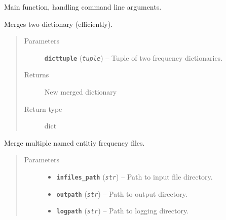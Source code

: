 \documentclass[letterpaper,10pt,english]{sphinxmanual}
\begin{document}

\begin{fulllineitems}
\label{src.prep.nes:src.prep.nes.merge.main}
Main function, handling command line arguments.

\end{fulllineitems}


\begin{fulllineitems}
\label{src.prep.nes:src.prep.nes.merge.merge_dicts}
Merges two dictionary (efficiently).
\begin{quote}\begin{description}
\item[{Parameters}] \leavevmode
\textbf{\texttt{dicttuple}} (\emph{\texttt{tuple}}) -- Tuple of two frequency dictionaries.

\item[{Returns}] \leavevmode
New merged dictionary

\item[{Return type}] \leavevmode
dict

\end{description}\end{quote}

\end{fulllineitems}


\begin{fulllineitems}
\label{src.prep.nes:src.prep.nes.merge.merge_frequency_files}
Merge multiple named entitiy frequency files.
\begin{quote}\begin{description}
\item[{Parameters}] \leavevmode\begin{itemize}
\item {} 
\textbf{\texttt{infiles\_path}} (\emph{\texttt{str}}) -- Path to input file directory.

\item {} 
\textbf{\texttt{outpath}} (\emph{\texttt{str}}) -- Path to output directory.

\item {} 
\textbf{\texttt{logpath}} (\emph{\texttt{str}}) -- Path to logging directory.

\end{itemize}

\end{description}\end{quote}

\end{fulllineitems}
\end{document}
